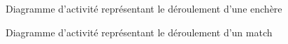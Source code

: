 \documentclass[a4paper]{report}
\begin{document}
\begin{figure}[H]
    \caption{\label{3} Diagramme d'activité représentant le déroulement d'une enchère}
\end{figure}

\begin{figure}[H]
    \caption{\label{3} Diagramme d'activité représentant le déroulement d'un match}
\end{figure}
\end{document}
